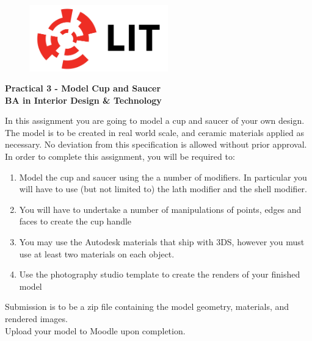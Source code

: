 
	

\newpage
\setcounter{page}{1}
\begin{center}
	\begin{figure}[ht]
		\centering
		\includegraphics[width = 6cm]{img/LITlogo.jpg}
		\label{fig:logoa3}
	\end{figure}
	\Large\textbf{Practical 3 - Model Cup and Saucer}\\
	\large\textbf{BA in Interior Design \& Technology}
\end{center}
In this assignment you are going to model a cup and saucer of your own design.  The model is to be created in real world scale, and ceramic materials applied as necessary.  No deviation from this specification is allowed without prior approval.  In order to complete this assignment, you will be required to:
\begin{enumerate}
	\item Model the cup and saucer using the a number of modifiers.  In particular you will have to use (but not limited to) the lath modifier and the shell modifier.
	\item You will have to undertake a number of manipulations of points, edges and faces to create the cup handle
	\item You may use the Autodesk materials that ship with 3DS, however you must use at least two materials on each object.
	\item Use the photography studio template to create the renders of your finished model
\end{enumerate}

Submission is to be a zip file containing the model geometry, materials, and rendered images.\\

Upload your model to Moodle upon completion.

